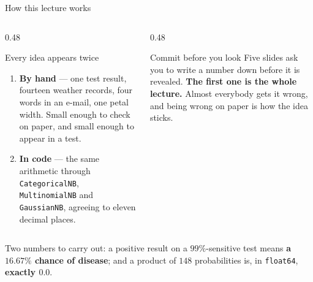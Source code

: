 \documentclass[aspectratio=169]{beamer}
\begin{document}
\begin{frame}[shrink=6]{How this lecture works}
  \begin{columns}[T]
    \begin{column}{0.48\textwidth}
      \begin{block}{Every idea appears twice}
        \begin{enumerate}
          \item \textbf{By hand} --- one test result, fourteen weather
            records, four words in an e-mail, one petal width. Small enough
            to check on paper, and small enough to appear in a test.
          \item \textbf{In code} --- the same arithmetic through
            \texttt{CategoricalNB}, \texttt{MultinomialNB} and
            \texttt{GaussianNB}, agreeing to eleven decimal places.
        \end{enumerate}
      \end{block}
    \end{column}
    \begin{column}{0.48\textwidth}
      \begin{alertblock}{Commit before you look}
        Five slides ask you to write a number down before it is revealed.
        \textbf{The first one is the whole lecture.} Almost everybody gets it
        wrong, and being wrong on paper is how the idea sticks.
      \end{alertblock}
    \end{column}
  \end{columns}
  \vspace{0.4em}
  \begin{center}
    \small Two numbers to carry out: a positive result on a $99\%$-sensitive
    test means \textbf{a $16.67\%$ chance of disease}; and a product of
    $148$ probabilities is, in \texttt{float64}, \textbf{exactly $0.0$}.
  \end{center}
\end{frame}
\end{document}
